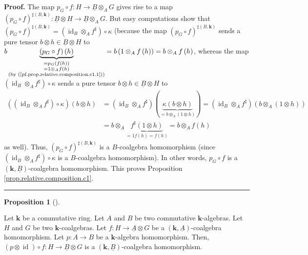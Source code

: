 \documentclass[numbers=enddot,12pt,final,onecolumn,notitlepage,abstracton]{scrartcl}%
\theoremstyle{definition}
\newtheorem{prop}[theo]{Proposition}
\newenvironment{proposition}[1][]
{\begin{prop}[#1]\begin{leftbar}}
{\end{leftbar}\end{prop}}
\newenvironment{proof}[1][Proof]{\noindent\textbf{#1.} }{\ \rule{0.5em}{0.5em}}
\begin{document}
\begin{proof}
The map $p_{G}\circ f:H\rightarrow\underline{B}\otimes_{A}G$ gives rise to a
map $\left(  p_{G}\circ f\right)  ^{\sharp\left(  B,\mathbf{k}\right)
}:\underline{B}\otimes H\rightarrow\underline{B}\otimes_{A}G$. But easy
computations show that $\left(  p_{G}\circ f\right)  ^{\sharp\left(
B,\mathbf{k}\right)  }=\left(  \operatorname*{id}\nolimits_{B}\otimes
_{A}f^{\sharp}\right)  \circ\kappa$ (because the map $\left(  p_{G}\circ
f\right)  ^{\sharp\left(  B,\mathbf{k}\right)  }$ sends a pure tensor
$b\otimes h\in\underline{B}\otimes H$ to $b\underbrace{\left(  p_{G}\circ
f\right)  \left(  h\right)  }_{\substack{=p_{G}\left(  f\left(  h\right)
\right)  \\=1\otimes_{A}f\left(  h\right)  \\\text{(by
(\ref{pf.prop.relative.composition.c1.1}))}}}=b\left(  1\otimes_{A}f\left(
h\right)  \right)  =b\otimes_{A}f\left(  h\right)  $, whereas the map $\left(
\operatorname*{id}\nolimits_{B}\otimes_{A}f^{\sharp}\right)  \circ\kappa$
sends a pure tensor $b\otimes h\in\underline{B}\otimes H$ to
\begin{align*}
\left(  \left(  \operatorname*{id}\nolimits_{B}\otimes_{A}f^{\sharp}\right)
\circ\kappa\right)  \left(  b\otimes h\right)   &  =\left(  \operatorname*{id}%
\nolimits_{B}\otimes_{A}f^{\sharp}\right)  \left(  \underbrace{\kappa\left(
b\otimes h\right)  }_{=b\otimes_{A}\left(  1\otimes h\right)  }\right)
=\left(  \operatorname*{id}\nolimits_{B}\otimes_{A}f^{\sharp}\right)  \left(
b\otimes_{A}\left(  1\otimes h\right)  \right) \\
&  =b\otimes_{A}\underbrace{f^{\sharp}\left(  1\otimes h\right)  }_{=1f\left(
h\right)  =f\left(  h\right)  }=b\otimes_{A}f\left(  h\right)
\end{align*}
as well). Thus, $\left(  p_{G}\circ f\right)  ^{\sharp\left(  B,\mathbf{k}%
\right)  }$ is a $B$-coalgebra homomorphism (since $\left(  \operatorname*{id}%
\nolimits_{B}\otimes_{A}f^{\sharp}\right)  \circ\kappa$ is a $B$-coalgebra
homomorphism). In other words, $p_{G}\circ f$ is a $\left(  \mathbf{k}%
,\underline{B}\right)  $-coalgebra homomorphism. This proves Proposition
\ref{prop.relative.composition.c1}.
\end{proof}

\begin{proposition}
\label{prop.relative.composition.c2}Let $\mathbf{k}$ be a commutative ring.
Let $A$ and $B$ be two commutative $\mathbf{k}$-algebras. Let $H$ and $G$ be
two $\mathbf{k}$-coalgebras. Let $f:H\rightarrow\underline{A}\otimes G$ be a
$\left(  \mathbf{k},\underline{A}\right)  $-coalgebra homomorphism. Let
$p:A\rightarrow B$ be a $\mathbf{k}$-algebra homomorphism. Then, $\left(
p\otimes\operatorname*{id}\right)  \circ f:H\rightarrow\underline{B}\otimes G$
is a $\left(  \mathbf{k},\underline{B}\right)  $-coalgebra homomorphism.
\end{proposition}
\end{document}
